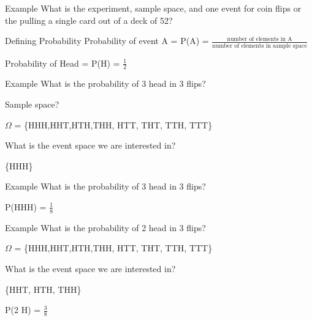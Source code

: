 \documentclass[presentation]{beamer}
\begin{document}
\begin{frame}[label={sec:orgb5c39d6}]{Example}
What is the experiment, sample space, and one event for coin flips or the pulling a single card out of a deck of 52?
\end{frame}

\begin{frame}[label={sec:org293ac4c}]{Defining Probability}
Probability of event A = P(A) = \(\frac{\text{number of elements in A}}{\text{number of elements in sample space}}\)

\pause

Probability of Head = P(H) = \(\frac{1}{2}\)
\end{frame}


\begin{frame}[label={sec:org05f8536}]{Example}
What is the probability of 3 head in 3 flips?

Sample space?

\pause

\(\Omega\) = \{HHH,HHT,HTH,THH, HTT, THT, TTH, TTT\}

\pause

What is the event space we are interested in?

\pause

\{HHH\}
\end{frame}

\begin{frame}[label={sec:org42e259d}]{Example}
What is the probability of 3 head in 3 flips?


\pause

P(HHH) = \(\frac{1}{8}\)
\end{frame}


\begin{frame}[label={sec:orgc2d41e8}]{Example}
What is the probability of 2 head in 3 flips?

\(\Omega\) = \{HHH,HHT,HTH,THH, HTT, THT, TTH, TTT\}

What is the event space we are interested in?

\pause

\{HHT, HTH, THH\}

\pause

P(2 H) = \(\frac{3}{8}\)
\end{frame}
\end{document}
